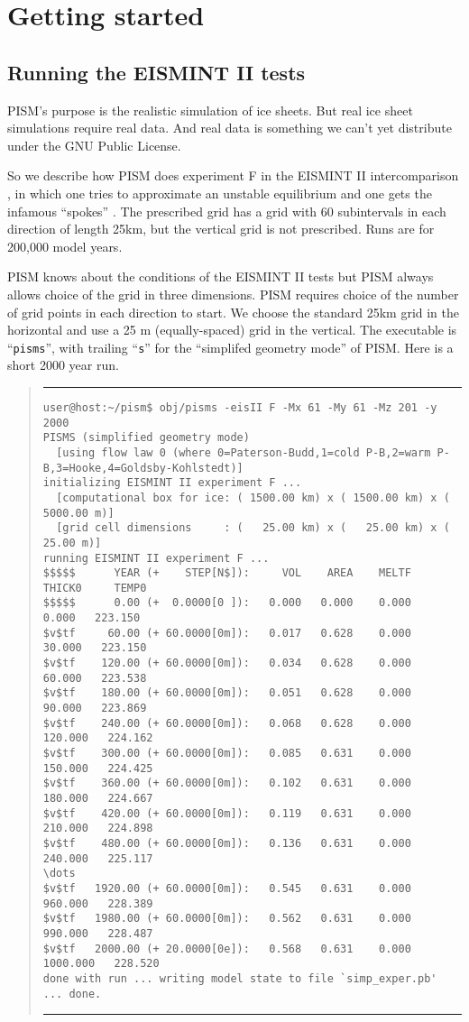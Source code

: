 \documentclass[11pt,final]{amsart}
\renewcommand{\t}[1]{\texttt{#1}}
\newcommand{\Vend}{ \rule{4.6in}{0.1mm}\end{quote}\normalsize }
\newcommand{\beginV}{ \scriptsize\begin{quote}\rule{4.6in}{0.1mm}\begin{verbatim} }
\begin{document}
\clearpage
\newpage
\section{Getting started}

\subsection{Running the EISMINT II tests}  PISM's purpose is the realistic simulation of ice sheets.  But real ice sheet simulations require real data.  And real data is something we can't yet distribute under the GNU Public License.

So we describe how PISM does experiment F in the EISMINT II intercomparison \cite{EISMINT00}, in which one tries to approximate an unstable equilibrium and one gets the infamous ``spokes'' \cite{BBL}.  The prescribed grid has a grid with 60 subintervals in each direction of length 25km, but the vertical grid is not prescribed.  Runs are for 200,000 model years.

PISM knows about the conditions of the EISMINT II tests but PISM always allows choice of the grid in three dimensions.  PISM requires choice of the number of grid points in each direction to start.  We choose the standard 25km grid in the horizontal and use a 25 m (equally-spaced) grid in the vertical.  The executable is ``\t{pisms}'', with trailing ``\t{s}'' for the ``simplifed geometry mode'' of PISM.  Here is a short 2000 year run.

\beginV
user@host:~/pism$ obj/pisms -eisII F -Mx 61 -My 61 -Mz 201 -y 2000
PISMS (simplified geometry mode)
  [using flow law 0 (where 0=Paterson-Budd,1=cold P-B,2=warm P-B,3=Hooke,4=Goldsby-Kohlstedt)]
initializing EISMINT II experiment F ...
  [computational box for ice: ( 1500.00 km) x ( 1500.00 km) x ( 5000.00 m)]
  [grid cell dimensions     : (   25.00 km) x (   25.00 km) x (   25.00 m)]
running EISMINT II experiment F ...
$$$$$      YEAR (+    STEP[N$]):     VOL    AREA    MELTF     THICK0     TEMP0
$$$$$      0.00 (+  0.0000[0 ]):   0.000   0.000    0.000      0.000   223.150
$v$tf     60.00 (+ 60.0000[0m]):   0.017   0.628    0.000     30.000   223.150
$v$tf    120.00 (+ 60.0000[0m]):   0.034   0.628    0.000     60.000   223.538
$v$tf    180.00 (+ 60.0000[0m]):   0.051   0.628    0.000     90.000   223.869
$v$tf    240.00 (+ 60.0000[0m]):   0.068   0.628    0.000    120.000   224.162
$v$tf    300.00 (+ 60.0000[0m]):   0.085   0.631    0.000    150.000   224.425
$v$tf    360.00 (+ 60.0000[0m]):   0.102   0.631    0.000    180.000   224.667
$v$tf    420.00 (+ 60.0000[0m]):   0.119   0.631    0.000    210.000   224.898
$v$tf    480.00 (+ 60.0000[0m]):   0.136   0.631    0.000    240.000   225.117
\dots
$v$tf   1920.00 (+ 60.0000[0m]):   0.545   0.631    0.000    960.000   228.389
$v$tf   1980.00 (+ 60.0000[0m]):   0.562   0.631    0.000    990.000   228.487
$v$tf   2000.00 (+ 20.0000[0e]):   0.568   0.631    0.000   1000.000   228.520
done with run ... writing model state to file `simp_exper.pb' ... done.
\end{verbatim}
\Vend
\end{document}
